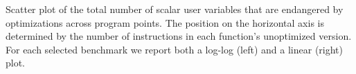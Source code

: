 \label{fig:CS-debug-tot-dead} Scatter plot of the total number of scalar user variables that are endangered by optimizations across program points. The position on the horizontal axis is determined by the number of instructions in each function's unoptimized version. For each selected benchmark we report both a log-log (left) and a linear (right) plot.